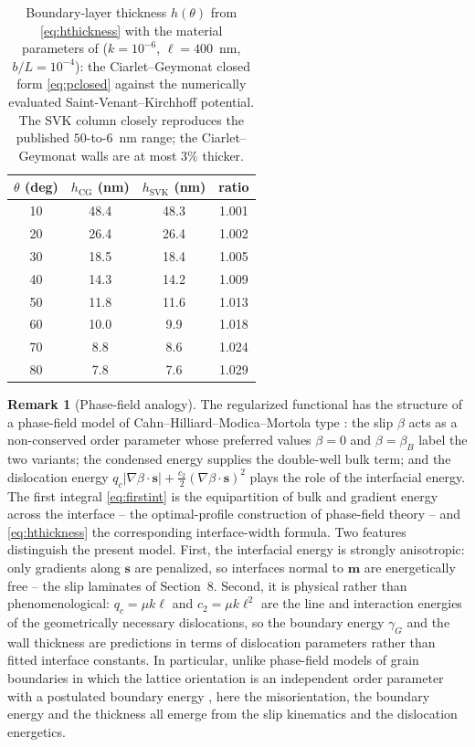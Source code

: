 \documentclass[12pt]{article}
\theoremstyle{plain}
\theoremstyle{definition}
\newtheorem{remark}[theorem]{Remark}
\newcommand{\bs}{\bm{s}}
\newcommand{\bmm}{\bm{m}}
\begin{document}
\begin{table}[h]\centering\small
\begin{tabular}{@{}cccc@{}}
\toprule
$\theta$ (deg) & $h_{\mathrm{CG}}$ (nm) & $h_{\mathrm{SVK}}$ (nm) & ratio\\
\midrule
10 & 48.4 & 48.3 & 1.001\\
20 & 26.4 & 26.4 & 1.002\\
30 & 18.5 & 18.4 & 1.005\\
40 & 14.3 & 14.2 & 1.009\\
50 & 11.8 & 11.6 & 1.013\\
60 & 10.0 &  9.9 & 1.018\\
70 &  8.8 &  8.6 & 1.024\\
80 &  7.8 &  7.6 & 1.029\\
\bottomrule
\end{tabular}
\caption{Boundary-layer thickness $h(\theta)$ from \eqref{eq:hthickness} with the
material parameters of \citet{koster2015bformation} ($k=10^{-6}$, $\ell=400$~nm,
$b/L=10^{-4}$): the Ciarlet--Geymonat closed form \eqref{eq:pclosed} against the
numerically evaluated Saint-Venant--Kirchhoff potential. The SVK column closely
reproduces the published $50$-to-$6$~nm range; the Ciarlet--Geymonat walls are at
most $3\%$ thicker. }
\label{tab:hthickness}
\end{table}

\begin{remark}[Phase-field analogy]
The regularized functional has the structure of a phase-field model of
Cahn--Hilliard--Modica--Mortola type \cite{cahn1958free,modica1987gradient}: the slip $\beta$ acts as a non-conserved order parameter whose preferred values $\beta=0$ and $\beta=\beta_B$ label the two variants; the condensed energy supplies the double-well bulk term; and the dislocation energy
$q_c|\nabla\beta\cdot\bs| + \tfrac{c_2}{2}(\nabla\beta\cdot\bs)^2$ plays the
role of the interfacial energy. The first integral \eqref{eq:firstint} is the equipartition
of bulk and gradient energy across the interface -- the optimal-profile
construction of phase-field theory -- and \eqref{eq:hthickness} the corresponding
interface-width formula. Two features distinguish the present model. First,
the interfacial energy is strongly anisotropic: only gradients along $\bs$
are penalized, so interfaces normal to $\bmm$ are energetically free -- the
slip laminates of Section~8. Second, it is physical rather than
phenomenological: $q_c=\mu k\ell$ and $c_2=\mu k\ell^2$ are the line and
interaction energies of the geometrically necessary dislocations, so the
boundary energy $\gamma_G$ and the wall thickness are predictions in terms of
dislocation parameters rather than fitted interface constants. In particular,
unlike phase-field models of grain boundaries in which the lattice
orientation is an independent order parameter with a postulated boundary
energy \cite{kobayashi2000continuum}, here the misorientation, the boundary energy and the thickness all emerge from the slip kinematics and the dislocation energetics.
\end{remark}
\end{document}
